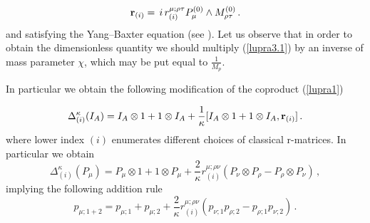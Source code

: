 \documentclass[a4paper,a4paper]{article}
\begin{document}
\begin{equation}\label{lupra3.1}
{\bf r}_{(i)} = \, i\, r^{\mu;\rho\tau}_{(i)}  P^{(0)}_{\mu}\wedge
M^{(0)}_{\rho\tau}\, .
\end{equation}
and satisfying  the Yang--Baxter equation (see \cite{zak}). Let us
observe that in order to obtain the   dimensionless quantity we
should multiply (\ref{lupra3.1}) by an inverse of mass parameter
$\chi$, which may be  put equal to $\frac{1}{M_p}$.

In particular we obtain the following modification of the
coproduct (\ref{lupra1})

\begin{equation}\label{lupra3.2}
  \Delta^{\kappa}_{(i)} (I_A) =
  I_A \otimes 1 + 1 \otimes I_A  +  \frac{1}{\kappa}
[ I_A \otimes 1 + 1 \otimes I_A, {\bf r}_{(i)} ]\, .
\end{equation}
where lower index $(i)$ enumerates different choices of %
 classical r-matrices.
In particular we obtain
\begin{equation}\label{lupra3.3}
  \Delta^{\kappa}_{(i)} (P_\mu) =
  P_\mu \otimes 1 + 1 \otimes P_\mu + \frac{2}{\kappa}
  r^{\mu;\rho \nu}_{(i)}
  (P_\nu \otimes P_\rho - P_\rho \otimes P_\nu )\, ,
\end{equation}
implying the following addition rule
\begin{equation}\label{lupra3.4}
p_{\mu;1+2} = p_{\mu;1}  + p_{\mu;2}  + \frac{2}{\kappa}
r^{\mu;\rho\nu}_{(i)} (p_{\nu;1}  p_{\rho;2} - p_{\rho;1}
p_{\nu;2} )\, .
\end{equation}
\end{document}
